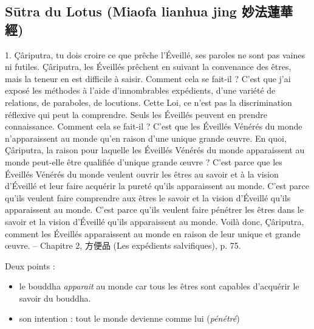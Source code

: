 \subsection{Sūtra du Lotus (Miaofa lianhua jing 妙法蓮華經)}



\begin{singlequote}
    1.	Çâriputra, tu dois croire ce que prêche l’Éveillé, ses paroles ne sont pas vaines ni futiles. Çâriputra, les Éveillés prêchent en suivant la convenance des êtres, mais la teneur en est difficile à saisir. Comment cela se fait-il ? C’est que j’ai exposé les méthodes à l’aide d’innombrables expédients, d’une variété de relations, de paraboles, de locutions. Cette Loi, ce n’est pas la discrimination réflexive qui peut la comprendre. Seuls les Éveillés peuvent en prendre connaissance. Comment cela se fait-il ? C’est que les Éveillés Vénérés du monde n’apparaissent au monde qu’en raison d’une unique grande œuvre. En quoi, Çâriputra, la raison pour laquelle les Éveillés Vénérés du monde apparaissent au monde peut-elle être qualifiée d’unique grande œuvre ?
C’est parce que les Éveillés Vénérés du monde veulent ouvrir les êtres au savoir et à la vision d’Éveillé et leur faire acquérir la pureté qu’ils apparaissent au monde.
C’est parce qu’ils veulent faire comprendre aux êtres le savoir et la vision d’Éveillé qu’ils apparaissent au monde.
C’est parce qu’ils veulent faire pénétrer les êtres dans le savoir et la vision d’Éveillé qu’ils apparaissent au monde.
Voilà donc, Çâriputra, comment les Éveillés apparaissent au monde en raison de leur unique et grande œuvre.
-- Chapitre 2, 方便品 (Les expédients salvifiques), p. 75.
\end{singlequote}

Deux points : 
\begin{itemize}
    \item le bouddha \textit{apparait} au monde car tous les êtres sont capables d'acquérir le savoir du bouddha.
    \item son intention : tout le monde devienne comme lui (\textit{pénétré})
\end{itemize}

